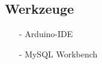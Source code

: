 \subsection{Werkzeuge}
\begin{itemize}
	\item[-] Arduino-IDE
	\item[-] MySQL Workbench
\end{itemize}
